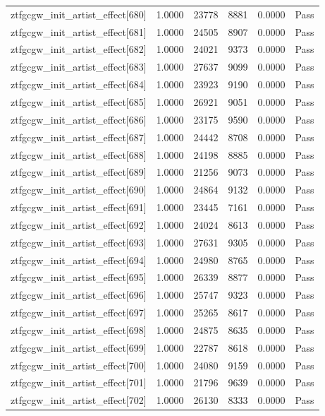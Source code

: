 \begin{table}[htbp]
\begin{tabular}{llrrll}
ztfgcgw\_init\_artist\_effect[680] & 1.0000 & 23778 & 8881 & 0.0000 & Pass \\
ztfgcgw\_init\_artist\_effect[681] & 1.0000 & 24505 & 8907 & 0.0000 & Pass \\
ztfgcgw\_init\_artist\_effect[682] & 1.0000 & 24021 & 9373 & 0.0000 & Pass \\
ztfgcgw\_init\_artist\_effect[683] & 1.0000 & 27637 & 9099 & 0.0000 & Pass \\
ztfgcgw\_init\_artist\_effect[684] & 1.0000 & 23923 & 9190 & 0.0000 & Pass \\
ztfgcgw\_init\_artist\_effect[685] & 1.0000 & 26921 & 9051 & 0.0000 & Pass \\
ztfgcgw\_init\_artist\_effect[686] & 1.0000 & 23175 & 9590 & 0.0000 & Pass \\
ztfgcgw\_init\_artist\_effect[687] & 1.0000 & 24442 & 8708 & 0.0000 & Pass \\
ztfgcgw\_init\_artist\_effect[688] & 1.0000 & 24198 & 8885 & 0.0000 & Pass \\
ztfgcgw\_init\_artist\_effect[689] & 1.0000 & 21256 & 9073 & 0.0000 & Pass \\
ztfgcgw\_init\_artist\_effect[690] & 1.0000 & 24864 & 9132 & 0.0000 & Pass \\
ztfgcgw\_init\_artist\_effect[691] & 1.0000 & 23445 & 7161 & 0.0000 & Pass \\
ztfgcgw\_init\_artist\_effect[692] & 1.0000 & 24024 & 8613 & 0.0000 & Pass \\
ztfgcgw\_init\_artist\_effect[693] & 1.0000 & 27631 & 9305 & 0.0000 & Pass \\
ztfgcgw\_init\_artist\_effect[694] & 1.0000 & 24980 & 8765 & 0.0000 & Pass \\
ztfgcgw\_init\_artist\_effect[695] & 1.0000 & 26339 & 8877 & 0.0000 & Pass \\
ztfgcgw\_init\_artist\_effect[696] & 1.0000 & 25747 & 9323 & 0.0000 & Pass \\
ztfgcgw\_init\_artist\_effect[697] & 1.0000 & 25265 & 8617 & 0.0000 & Pass \\
ztfgcgw\_init\_artist\_effect[698] & 1.0000 & 24875 & 8635 & 0.0000 & Pass \\
ztfgcgw\_init\_artist\_effect[699] & 1.0000 & 22787 & 8618 & 0.0000 & Pass \\
ztfgcgw\_init\_artist\_effect[700] & 1.0000 & 24080 & 9159 & 0.0000 & Pass \\
ztfgcgw\_init\_artist\_effect[701] & 1.0000 & 21796 & 9639 & 0.0000 & Pass \\
ztfgcgw\_init\_artist\_effect[702] & 1.0000 & 26130 & 8333 & 0.0000 & Pass \\

\end{tabular}
\end{table}
